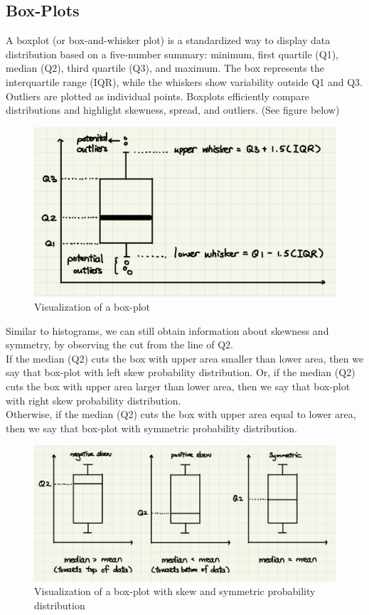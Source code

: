 \subsection{Box-Plots}
A boxplot (or box-and-whisker plot) is a standardized way to display data distribution based on a five-number summary: minimum, first quartile (Q1), median (Q2), third quartile (Q3), and maximum. The box represents the interquartile range (IQR), while the whiskers show variability outside Q1 and Q3. Outliers are plotted as individual points. Boxplots efficiently compare distributions and highlight skewness, spread, and outliers. (See figure below)

\begin{figure}[H]
 \centering
 \includegraphics[scale=0.25]{Section1/img/BoxPlot.jpg}
 \caption{Visualization of a box-plot}
\end{figure} 

\noindent
Similar to histograms, we can still obtain information about skewness and symmetry, by observing the cut from the line of Q2.\\

\noindent
If the median (Q2) cuts the box with upper area smaller than lower area, then we say that box-plot with left skew probability distribution. Or, if the median (Q2) cuts the box with upper area larger than lower area, then we say that box-plot with right skew probability distribution.\\

\noindent
Otherwise, if the median (Q2) cuts the box with upper area equal to lower area, then we say that box-plot with symmetric probability distribution.

\begin{figure}[H]
 \centering
 \includegraphics[scale=0.15]{Section1/img/Bskew.jpg}
 \caption{Visualization of a box-plot with skew and symmetric probability distribution}
\end{figure}


